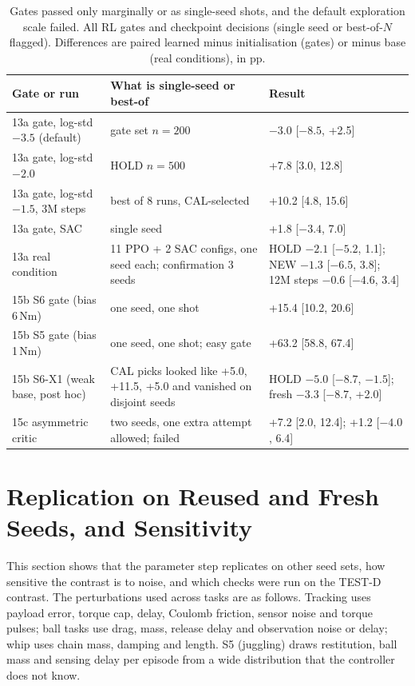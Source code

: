 \begin{table}[htbp]
\centering
\caption{Gates passed only marginally or as single-seed shots, and the default exploration scale failed. All RL gates and checkpoint decisions (single seed or best-of-$N$ flagged). Differences are paired learned minus initialisation (gates) or minus base (real conditions), in pp.}
\label{tab:gates}
\begin{tabular}{@{}p{4.4cm}p{5.3cm}p{3.5cm}@{}}
\toprule
Gate or run & What is single-seed or best-of & Result \\ \midrule
13a gate, log-std $-3.5$ (default) & gate set $n{=}200$ & $-3.0$ [$-8.5$, +2.5] \\
13a gate, log-std $-2.0$ & HOLD $n{=}500$ & +7.8 [3.0, 12.8] \\
13a gate, log-std $-1.5$, 3M steps & best of 8 runs, CAL-selected & +10.2 [4.8, 15.6] \\
13a gate, SAC & single seed & +1.8 [$-3.4$, 7.0] \\
13a real condition & 11 PPO + 2 SAC configs, one seed each; confirmation 3 seeds & HOLD $-2.1$ [$-5.2$, 1.1]; NEW $-1.3$ [$-6.5$, 3.8]; 12M steps $-0.6$ [$-4.6$, 3.4] \\
15b S6 gate (bias 6\,Nm) & one seed, one shot & +15.4 [10.2, 20.6] \\
15b S5 gate (bias 1\,Nm) & one seed, one shot; easy gate & +63.2 [58.8, 67.4] \\
15b S6-X1 (weak base, post hoc) & CAL picks looked like +5.0, +11.5, +5.0 and vanished on disjoint seeds & HOLD $-5.0$ [$-8.7$, $-1.5$]; fresh $-3.3$ [$-8.7$, +2.0] \\
15c asymmetric critic & two seeds, one extra attempt allowed; failed & +7.2 [2.0, 12.4]; +1.2 [$-4.0$, 6.4] \\
\bottomrule
\end{tabular}
\end{table}

\section{Replication on Reused and Fresh Seeds, and Sensitivity}
\label{app:replication}

This section shows that the parameter step replicates on other seed sets, how sensitive the contrast is to noise, and which checks were run on the TEST-D contrast. The perturbations used across tasks are as follows. Tracking uses payload error, torque cap, delay, Coulomb friction, sensor noise and torque pulses; ball tasks use drag, mass, release delay and observation noise or delay; whip uses chain mass, damping and length. S5 (juggling) draws restitution, ball mass and sensing delay per episode from a wide distribution that the controller does not know.

